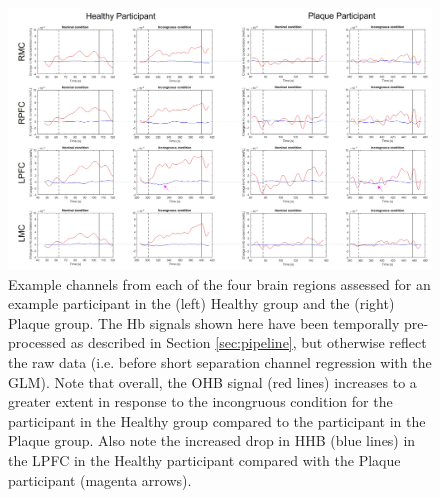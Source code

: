 \documentclass[12pt]{spieman}  %
\begin{document}
\begin{spacing}{2}
\begin{figure}
\begin{center}
\includegraphics[width = \linewidth]{Fig6_rawHHB.jpg}
\end{center}
\caption 
{\label{fig:rawHHB} Example channels from each of the four brain regions assessed for an example participant in the (left) Healthy group and the (right) Plaque group. The Hb signals shown here have been temporally pre-processed as described in Section \ref{sec:pipeline}, but otherwise reflect the raw data (i.e. before short separation channel regression with the GLM). Note that overall, the OHB signal (red lines) increases to a greater extent in response to the incongruous condition for the participant in the Healthy group compared to the participant in the Plaque group. Also note the increased drop in HHB (blue lines) in the LPFC in the Healthy participant compared with the Plaque participant (magenta arrows).} 
\end{figure} 


\end{spacing}
\end{document}
